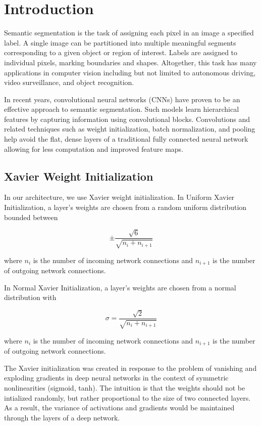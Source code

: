 \section*{Introduction}

Semantic segmentation is the task of assigning each pixel in an image a specified label. A single image can be partitioned into multiple meaningful segments corresponding to a given object or region of interest. Labels are assigned to individual pixels, marking boundaries and shapes. Altogether, this task has many applications in computer vision including but not limited to autonomous driving, video surveillance, and object recognition.

In recent years, convolutional neural networks (CNNs) have proven to be an effective approach to semantic segmentation. Such models learn hierarchical features by capturing information using convolutional blocks. Convolutions and related techniques such as weight initialization, batch normalization, and pooling help avoid the flat, dense layers of a traditional fully connected neural network allowing for less computation and improved feature maps.

\subsection*{Xavier Weight Initialization}
In our architecture, we use Xavier weight initialization. In Uniform Xavier Initialization, a layer’s weights are chosen from a random uniform distribution bounded between

\begin{equation}
	\pm \displaystyle\frac{\sqrt{6}}{\sqrt{n_i + n_{i + 1}}}
\end{equation}

where $n_i$ is the number of incoming network connections and $n_{i + 1}$ is the number of outgoing network connections.

In Normal Xavier Initialization, a layer’s weights are chosen from a normal distribution with

\begin{equation}
	\sigma = \displaystyle\frac{\sqrt{2}}{\sqrt{n_i + n_{i + 1}}}
\end{equation}

where $n_i$ is the number of incoming network connections and $n_{i + 1}$ is the number of outgoing network connections.

The Xavier initialization was created in response to the problem of vanishing and exploding gradients in deep neural networks in the context of symmetric nonlinearities (sigmoid, tanh). The intuition is that the weights should not be intialized randomly, but rather proportional to the size of two connected layers. As a result, the variance of activations and gradients would be maintained through the layers of a deep network.

